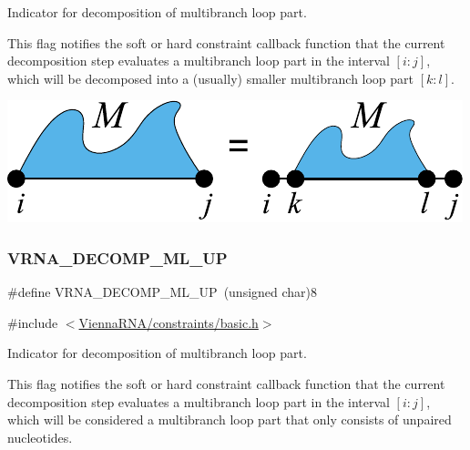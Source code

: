 Indicator for decomposition of multibranch loop part. 

This flag notifies the soft or hard constraint callback function that the current decomposition step evaluates a multibranch loop part in the interval $[i:j]$, which will be decomposed into a (usually) smaller multibranch loop part $[k:l]$.

 
\begin{DoxyImageNoCaption}
  \mbox{\includegraphics[width=\textwidth,height=\textheight/2,keepaspectratio=true]{decomp_ml_ml}}
\end{DoxyImageNoCaption}
 \mbox{\label{group__constraints_gae6478dda14e50e2f2cb9ef333a29256e}} 
\subsubsection{\texorpdfstring{VRNA\_DECOMP\_ML\_UP}{VRNA\_DECOMP\_ML\_UP}}
{\footnotesize\ttfamily \#define V\+R\+N\+A\+\_\+\+D\+E\+C\+O\+M\+P\+\_\+\+M\+L\+\_\+\+UP~(unsigned char)8}



{\ttfamily \#include $<$\mbox{\hyperlink{constraints_2basic_8h}{Vienna\+R\+N\+A/constraints/basic.\+h}}$>$}



Indicator for decomposition of multibranch loop part. 

This flag notifies the soft or hard constraint callback function that the current decomposition step evaluates a multibranch loop part in the interval $[i:j]$, which will be considered a multibranch loop part that only consists of unpaired nucleotides.

